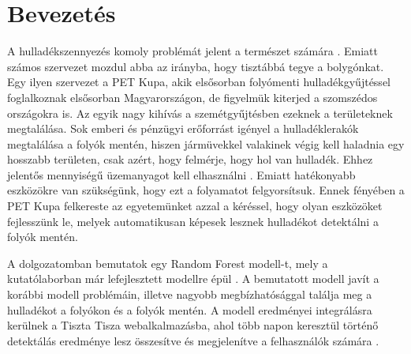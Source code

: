 \chapter{Bevezetés}
\label{ch:intro}

A hulladékszennyezés komoly problémát jelent a természet számára \cite{kibria2023PlasticWaste}. Emiatt számos szervezet mozdul abba az irányba, hogy tisztábbá tegye a bolygónkat. Egy ilyen szervezet a PET Kupa, akik elsősorban folyómenti hulladékgyűjtéssel foglalkoznak elsősorban Magyarországon, de figyelmük kiterjed a szomszédos országokra is. Az egyik nagy kihívás a szemétgyűjtésben ezeknek a területeknek megtalálása. Sok emberi és pénzügyi erőforrást igényel a hulladéklerakók megtalálása a folyók mentén, hiszen jármüvekkel valakinek végig kell haladnia egy hosszabb területen, csak azért, hogy felmérje, hogy hol van hulladék. Ehhez jelentős mennyiségű üzemanyagot kell elhasználni . Emiatt hatékonyabb eszközökre van szükségünk, hogy ezt a folyamatot felgyorsítsuk. Ennek fényében a PET Kupa felkereste az egyetemünket azzal a kéréssel, hogy olyan eszközöket fejlesszünk le, melyek automatikusan képesek lesznek hulladékot detektálni a folyók mentén.

A dolgozatomban bemutatok egy Random Forest modell-t, mely a kutatólaborban már lefejlesztett modellre épül \cite{magyar2023}. A bemutatott modell javít a korábbi modell problémáin, illetve nagyobb megbízhatósággal találja meg a hulladékot a folyókon és a folyók mentén. A modell eredményei integrálásra kerülnek a Tiszta Tisza webalkalmazásba, ahol több napon keresztül történő detektálás eredménye lesz összesítve és megjelenítve a felhasználók számára .